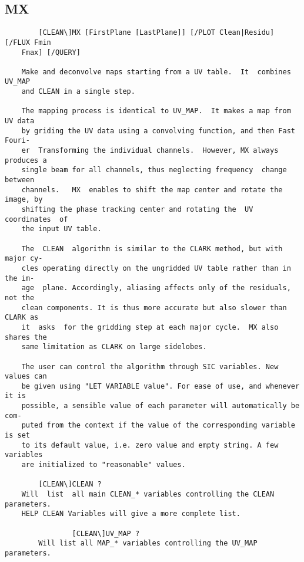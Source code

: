 \subsection{MX}
\begin{verbatim}
        [CLEAN\]MX [FirstPlane [LastPlane]] [/PLOT Clean|Residu] [/FLUX Fmin
    Fmax] [/QUERY]

    Make and deconvolve maps starting from a UV table.  It  combines  UV_MAP
    and CLEAN in a single step.

    The mapping process is identical to UV_MAP.  It makes a map from UV data
    by griding the UV data using a convolving function, and then Fast Fouri-
    er  Transforming the individual channels.  However, MX always produces a
    single beam for all channels, thus neglecting frequency  change  between
    channels.   MX  enables to shift the map center and rotate the image, by
    shifting the phase tracking center and rotating the  UV  coordinates  of
    the input UV table.

    The  CLEAN  algorithm is similar to the CLARK method, but with major cy-
    cles operating directly on the ungridded UV table rather than in the im-
    age  plane. Accordingly, aliasing affects only of the residuals, not the
    clean components. It is thus more accurate but also slower than CLARK as
    it  asks  for the gridding step at each major cycle.  MX also shares the
    same limitation as CLARK on large sidelobes.

    The user can control the algorithm through SIC variables. New values can
    be given using "LET VARIABLE value". For ease of use, and whenever it is
    possible, a sensible value of each parameter will automatically be  com-
    puted from the context if the value of the corresponding variable is set
    to its default value, i.e. zero value and empty string. A few  variables
    are initialized to "reasonable" values.

        [CLEAN\]CLEAN ?
    Will  list  all main CLEAN_* variables controlling the CLEAN parameters.
    HELP CLEAN Variables will give a more complete list.

                [CLEAN\]UV_MAP ?
        Will list all MAP_* variables controlling the UV_MAP parameters.


\end{verbatim}
